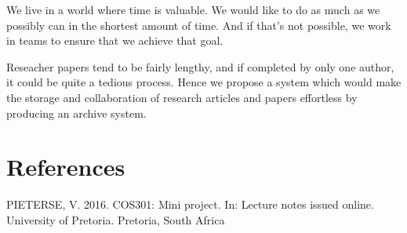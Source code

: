\documentclass[a4paper,12pt]{report}
\begin{document}
We live in a world where time is valuable. We would like to do as much as we possibly can in the shortest amount of time. And if that's not possible, we work in teams to ensure that we achieve that goal. 

Reseacher papers tend to be fairly lengthy, and if completed by only one author, it could be quite a tedious process. Hence we propose a system which would make the storage and collaboration of research articles and papers effortless by producing an archive system.

\newpage
\section{References}
PIETERSE, V. 2016. COS301: Mini project. In: Lecture notes issued online.  University of Pretoria. Pretoria, South Africa
\end{document}
